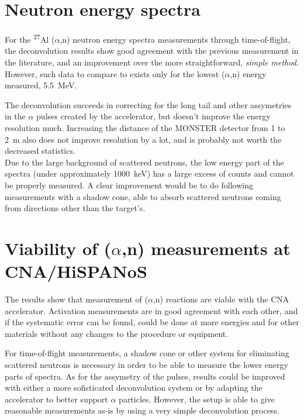 \documentclass[a4paper,12pt]{report}
\newcommand{\an}{($\alpha$,n) }
\newcommand{\Aliso}{\textsuperscript{27}Al }
\begin{document}
\section{Neutron energy spectra}
For the \Aliso\an neutron energy spectra measurements through time-of-flight, the deconvolution results show good agreement with the previous measurement in the literature, and an improvement over the more straightforward, \textit{simple method}.
However, such data to compare to exists only for the lowest \an energy measured, \qty{5.5}{\MeV}.

The deconvolution succeeds in correcting for the long tail and other assymetries in the $\alpha$ pulses created by the accelerator, but doesn't improve the energy resolution much.
Increasing the distance of the MONSTER detector from 1 to \qty{2}{\m} also does not improve resolution by a lot, and is probably not worth the decreased statistics.
\\

Due to the large background of scattered neutrons, the low energy part of the spectra (under approximately \qty{1000}{\keV}) has a large excess of counts and cannot be properly measured.
A clear improvement would be to do following measurements with a shadow cone, able to absorb scattered neutrons coming from directions other than the target's.

\section{Viability of \an measurements at CNA/HiSPANoS}
The results show that measurement of \an reactions are viable with the CNA accelerator.
Activation measurements are in good agreement with each other, and if the systematic error can be found, could be done at more energies and for other materials without any changes to the procedure or equipment.

For time-of-flight measurements, a shadow cone or other system for eliminating scattered neutrons is necessary in order to be able to measure the lower energy parts of spectra.
As for the assymetry of the pulses, results could be improved with either a more sofisticated deconvolution system or by adapting the accelerator to better support $\alpha$ particles.
However, the setup is able to give reasonable measurements as-is by using a very simple deconvolution process.
\end{document}
